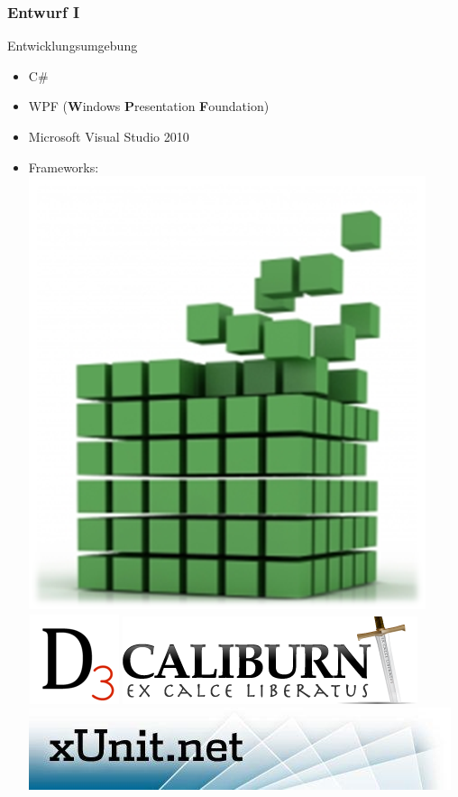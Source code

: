 \documentclass[t]{beamer}
\begin{document}
\begin{frame}
	\frametitle{Entwurf I}
	
	Entwicklungsumgebung ~\\
	\begin{itemize}
		\item<+-> C\#
		\item<+-> WPF (\textbf{W}indows \textbf{P}resentation \textbf{F}oundation)
		\item<+-> Microsoft Visual Studio 2010
        \item<+-> Frameworks:
            \pause
            \includegraphics[scale=0.1]{img/mef}
            \includegraphics[scale=0.4]{img/d3}
            \includegraphics[scale=0.3]{img/caliburn}
            \includegraphics[scale=0.3]{img/xunit} ~\\

\end{itemize}
\end{frame}
\end{document}
